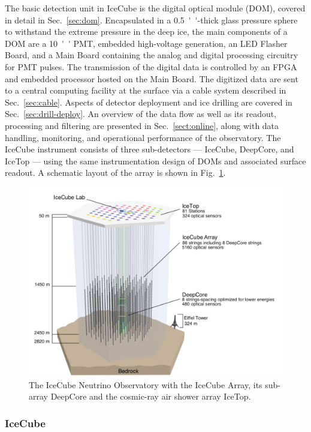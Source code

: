 The basic detection unit in IceCube is the
digital optical module (DOM), covered in detail in Sec.~\ref{sec:dom}.
Encapsulated in a \SI{0.5}{''}-thick glass pressure sphere 
to withstand the extreme pressure in the deep ice, the main components of a DOM
are a \SI{10}{''} PMT, embedded high-voltage generation, an LED Flasher 
Board, and a Main Board containing the analog and digital processing circuitry
for PMT pulses.  The transmission of the digital data is controlled by an FPGA
and embedded processor hosted on the Main Board. The digitized data are sent to a
central computing facility at the surface via a cable system described in
Sec.~\ref{sec:cable}.  Aspects of detector deployment and ice drilling are
covered in Sec.~\ref{sec:drill-deploy}. An overview of the data flow as well as
its readout, processing and filtering are presented in
Sec.~\ref{sect:online}, along with data handling, monitoring, and operational performance of
the observatory. The IceCube instrument consists of three sub-detectors ---
IceCube, DeepCore, and IceTop --- using the same instrumentation design of
DOMs and associated surface readout. A schematic layout of the array is
shown in Fig.~\ref{fig:array}. 

\begin{figure}[!h]
 \centering
 \includegraphics[width=\textwidth]{graphics/intro/ArrayWSeasonsLabels_crop.pdf}
 \caption{The IceCube Neutrino Observatory with the IceCube Array, its sub-array DeepCore and
   the cosmic-ray air shower array IceTop.}
 \label{fig:array}
\end{figure}

\subsubsection{IceCube}

